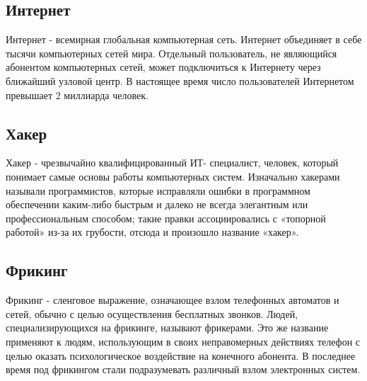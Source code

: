 \subsection*{Интернет}
	Интернет - всемирная глобальная компьютерная сеть. Интернет объединяет в себе тысячи компьютерных сетей мира. Отдельный пользователь, не являющийся абонентом компьютерных сетей, может подключиться к Интернету через ближайший узловой центр. В настоящее время число пользователей Интернетом превышает 2 миллиарда человек.

\subsection*{Хакер}
	Хакер - чрезвычайно квалифицированный ИТ- специалист, человек, который понимает самые основы работы компьютерных систем. Изначально хакерами называли программистов, которые исправляли ошибки в программном обеспечении каким-либо быстрым и далеко не всегда элегантным или профессиональным способом; такие правки ассоциировались с «топорной работой» из-за их грубости, отсюда и произошло название «хакер».

\subsection*{Фрикинг}
	Фрикинг - сленговое выражение, означающее взлом телефонных автоматов и сетей, обычно с целью осуществления бесплатных звонков. Людей, специализирующихся на фрикинге, называют фрикерами. Это же название применяют к людям, использующим в своих неправомерных действиях телефон с целью оказать психологическое воздействие на конечного абонента. В последнее время под фрикингом стали подразумевать различный взлом электронных систем.

